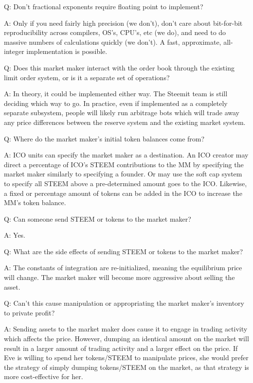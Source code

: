 \documentclass{article}
\begin{document}
Q:  Don't fractional exponents require floating point to implement?

A:  Only if you need fairly high precision (we don't), don't care about bit-for-bit
reproducibility across compilers, OS's, CPU's, etc (we do), and need to do massive
numbers of calculations quickly (we don't).  A fast, approximate, all-integer
implementation is possible.

Q:  Does this market maker interact with the order book through the existing limit order
system, or is it a separate set of operations?

A:  In theory, it could be implemented either way.  The Steemit team is still deciding
which way to go.  In practice, even if implemented as a completely separate subsystem,
people will likely run arbitrage bots which will trade away any price differences
between the reserve system and the existing market system.

Q:  Where do the market maker's initial token balances come from?

A:  ICO units can specify the market maker as a destination.  An ICO creator
may direct a percentage of ICO's STEEM contributions to the MM by specifying
the market maker similarly to specifying a founder.  Or may use the soft cap
system to specify all STEEM above a pre-determined amount goes to the ICO.  Likewise,
a fixed or percentage amount of tokens can be added in the ICO to increase the MM's
token balance.

Q:  Can someone send STEEM or tokens to the market maker?

A:  Yes.

Q:  What are the side effects of sending STEEM or tokens to the market maker?

A:  The constants of integration are re-initialized, meaning the equilibrium price will
change.  The market maker will become more aggressive about selling the asset.

Q:  Can't this cause manipulation or appropriating the market maker's inventory
to private profit?

A:  Sending assets to the market maker does cause it to engage in trading activity
which affects the price.  However, dumping an identical amount on the market will
result in a larger amount of trading activity and a larger effect on the price.  If
Eve is willing to spend her tokens/STEEM to manipulate prices, she would prefer
the strategy of simply dumping tokens/STEEM on the market, as that strategy is more
cost-effective for her.
\end{document}
